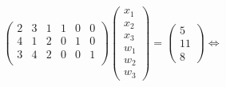 \documentclass[10pt, aspectratio=169]{beamer}
\begin{document}
    \begin{frame}
        \[
            \begin{pmatrix}
                    2 & 3 & 1 & 1 & 0 & 0 \\
                    4 & 1 & 2 & 0 & 1 & 0 \\
                    3 & 4 & 2 & 0 & 0 & 1 \\
            \end{pmatrix}
            \begin{pmatrix}
                x_1 \\
                x_2 \\
                x_3 \\
                w_1 \\
                w_2 \\
                w_3
            \end{pmatrix} =
            \begin{pmatrix}
                5 \\
                11 \\
                8
            \end{pmatrix} \iff
        \]


\end{frame}
\end{document}
